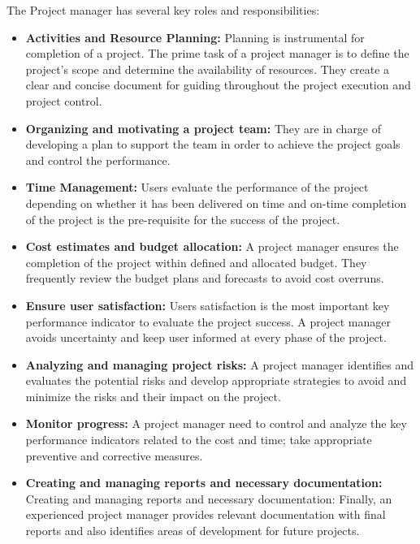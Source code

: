 The Project manager has several key roles and responsibilities:

\begin{itemize}
    \item \textbf{Activities and Resource Planning:}  Planning is instrumental for completion of a project. The prime task of a project manager is to define the project’s scope and determine the availability of resources. They create a clear and concise document for guiding throughout the project execution and project control.

\item \textbf{Organizing and motivating a project team:} They are in charge of developing a plan to support the team in order to achieve the project goals and control the performance.

\item \textbf{Time Management:} Users evaluate the performance of the project depending on whether it has been delivered on time and on-time completion of the project is the pre-requisite for the success of the project.

\item \textbf{Cost estimates and budget allocation:}  A project manager ensures the completion of the project within defined and allocated budget. They frequently review the budget plans and forecasts to avoid cost overruns.

\item \textbf{Ensure user satisfaction:} Users satisfaction is the most important key performance indicator to evaluate the project success. A project manager avoids uncertainty and keep user informed at every phase of the project.

\item \textbf{Analyzing and managing project risks:} A project manager identifies and evaluates the potential risks and develop appropriate strategies to avoid and minimize the risks and their impact on the project. 

\item \textbf{Monitor progress:} A project manager need to control and analyze the key performance indicators related to the cost and time; take appropriate preventive and corrective measures. 

\item \textbf{Creating and managing reports and necessary documentation:} Creating and managing reports and necessary documentation: Finally, an experienced project manager provides relevant documentation with final reports and also identifies areas of development for future projects.
\end{itemize}

